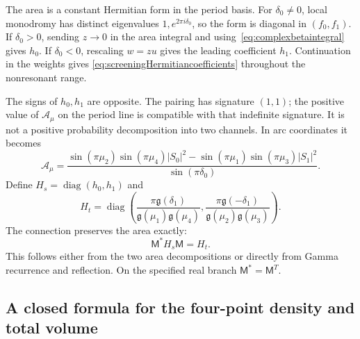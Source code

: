 \documentclass[11pt,a4paper]{article}
\numberwithin{equation}{section}
\theoremstyle{definition}
\theoremstyle{remark}
\DeclareMathOperator{\diag}{diag}
\begin{document}
The area is a constant Hermitian form in the period basis.
For $\delta_0\ne0$, local monodromy has distinct eigenvalues
$1,e^{2\pi i\delta_0}$, so the form is diagonal in
$(f_0,f_1)$. If $\delta_0>0$, sending $z\to0$ in the area
integral and using~\eqref{eq:complexbetaintegral} gives $h_0$.
If $\delta_0<0$, rescaling $w=zu$ gives the leading
coefficient $h_1$. Continuation in the weights gives
\eqref{eq:screeningHermitiancoefficients} throughout the
nonresonant range.

The signs of $h_0,h_1$ are opposite. The pairing has signature
$(1,1)$; the positive value of $\mathcal A_\mu$ on the period
line is compatible with that indefinite signature. It is not
a positive probability decomposition into two channels.
In arc coordinates it becomes
\begin{equation}
 \mathcal A_\mu=
 \frac{\sin(\pi\mu_2)\sin(\pi\mu_4)|S_0|^2
       -\sin(\pi\mu_1)\sin(\pi\mu_3)|S_1|^2}
      {\sin(\pi\delta_0)}.
 \label{eq:screeningarcarea}
\end{equation}
Define $H_s=\diag(h_0,h_1)$ and
\[
 H_t=\diag\left(
   \frac{\pi\mathfrak g(\delta_1)}
        {\mathfrak g(\mu_1)\mathfrak g(\mu_4)},
   \frac{\pi\mathfrak g(-\delta_1)}
        {\mathfrak g(\mu_2)\mathfrak g(\mu_3)}\right).
\]
The connection preserves the area exactly:
\begin{equation}
 \mathsf M^*H_s\mathsf M=H_t.
 \label{eq:fusionHermitianidentity}
\end{equation}
This follows either from the two area decompositions or
directly from Gamma recurrence and reflection. On the
specified real branch $\mathsf M^*=\mathsf M^T$.

\subsection{A closed formula for the four-point density and total volume}
\end{document}
